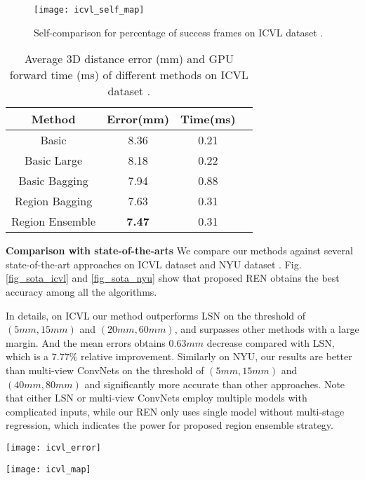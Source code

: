 \documentclass{article}
\begin{document}
\begin{figure}[htb]
\centering
{\texttt{[image: icvl\_self\_map]}}
\caption{Self-comparison for percentage of success frames on ICVL dataset \cite{tang2014latent}. }
\label{fig_self}
\end{figure}

\begin{table}[htb]
\label{table_result}
\caption{Average 3D distance error (mm) and GPU forward time (ms) of different methods on ICVL dataset \cite{tang2014latent}.}
\centering
\begin{tabular}{|c|c|c|c|}
\hline
Method & Error(mm) & Time(ms)\\
\hline
Basic & 8.36 & 0.21\\
Basic Large & 8.18 & 0.22\\
Basic Bagging & 7.94 & 0.88\\
Region Bagging & 7.63 & 0.31\\
Region Ensemble & \textbf{7.47} & 0.31 \\
\hline
\end{tabular}
\end{table}

\noindent\textbf{Comparison with state-of-the-arts}\hspace{2mm} We compare our methods against several state-of-the-art approaches on ICVL dataset \cite{tang2014latent} \cite{oberweger2015hands} \cite{sun2015cascaded} \cite{zhou2016model} \cite{wan2016hand} and NYU dataset \cite{tompson2014real} \cite{oberweger2015hands} \cite{oberwegertraining} \cite{sinha2016deephand} \cite{gerobust} \cite{zhou2016model} \cite{zhang2016learning}. Fig.\ref{fig_sota_icvl} and \ref{fig_sota_nyu} show that proposed REN obtains the best accuracy among all the algorithms.

In details, on ICVL our method outperforms LSN \cite{wan2016hand} on the threshold of $(5mm, 15mm)$ and $(20mm, 60mm)$, and surpasses other methods with a large margin. And the mean errors obtains $0.63mm$ decrease compared with LSN, which is a $7.77\%$ relative improvement. Similarly on NYU, our results are better than multi-view ConvNets \cite{gerobust} on the threshold of $(5mm, 15mm)$ and $(40mm, 80mm)$ and significantly more accurate than other approaches. Note that either LSN or multi-view ConvNets employ multiple models with complicated inputs, while our REN only uses single model without multi-stage regression, which indicates the power for proposed region ensemble strategy.
\begin{figure*}[htb]
\centering
\begin{minipage}[b]{0.49\textwidth}
  \centering
  \centerline{\texttt{[image: icvl\_error]}}
\end{minipage}
\begin{minipage}[b]{0.49\textwidth}
  \centering
  \centerline{\texttt{[image: icvl\_map]}}
\end{minipage}
\caption{Comparison with state-of-the-arts on ICVL \cite{tang2014latent} dataset: distance error (left) and percentage of success frames (right).}
\label{fig_sota_icvl}
\end{figure*}
\end{document}

